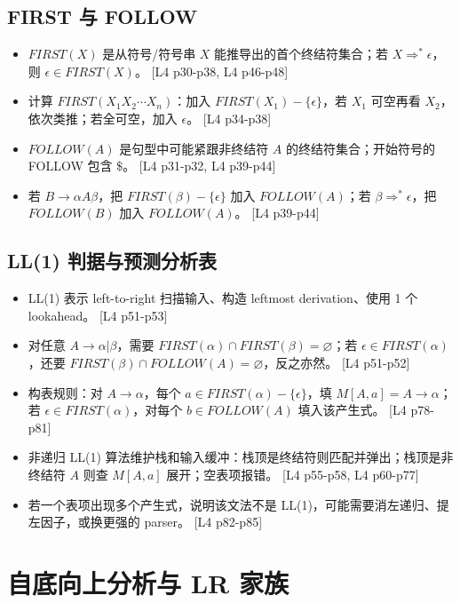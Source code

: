 \documentclass[UTF8,fontset=none,11pt]{ctexart}
\newcommand{\pg}[1]{{\scriptsize\textcolor{citegray}{[#1]}}}
\begin{document}
\subsection{FIRST 与 FOLLOW}

\begin{itemize}
  \item \(FIRST(X)\) 是从符号/符号串 \(X\) 能推导出的首个终结符集合；若 \(X\Rightarrow^*\epsilon\)，则 \(\epsilon\in FIRST(X)\)。 \pg{L4 p30-p38, L4 p46-p48}
  \item 计算 \(FIRST(X_1X_2\cdots X_n)\)：加入 \(FIRST(X_1)-\{\epsilon\}\)，若 \(X_1\) 可空再看 \(X_2\)，依次类推；若全可空，加入 \(\epsilon\)。 \pg{L4 p34-p38}
  \item \(FOLLOW(A)\) 是句型中可能紧跟非终结符 \(A\) 的终结符集合；开始符号的 FOLLOW 包含 \(\$\)。 \pg{L4 p31-p32, L4 p39-p44}
  \item 若 \(B\to\alpha A\beta\)，把 \(FIRST(\beta)-\{\epsilon\}\) 加入 \(FOLLOW(A)\)；若 \(\beta\Rightarrow^*\epsilon\)，把 \(FOLLOW(B)\) 加入 \(FOLLOW(A)\)。 \pg{L4 p39-p44}
\end{itemize}

\subsection{LL(1) 判据与预测分析表}

\begin{itemize}
  \item LL(1) 表示 left-to-right 扫描输入、构造 leftmost derivation、使用 1 个 lookahead。 \pg{L4 p51-p53}
  \item 对任意 \(A\to\alpha|\beta\)，需要 \(FIRST(\alpha)\cap FIRST(\beta)=\varnothing\)；若 \(\epsilon\in FIRST(\alpha)\)，还要 \(FIRST(\beta)\cap FOLLOW(A)=\varnothing\)，反之亦然。 \pg{L4 p51-p52}
  \item 构表规则：对 \(A\to\alpha\)，每个 \(a\in FIRST(\alpha)-\{\epsilon\}\)，填 \(M[A,a]=A\to\alpha\)；若 \(\epsilon\in FIRST(\alpha)\)，对每个 \(b\in FOLLOW(A)\) 填入该产生式。 \pg{L4 p78-p81}
  \item 非递归 LL(1) 算法维护栈和输入缓冲：栈顶是终结符则匹配并弹出；栈顶是非终结符 \(A\) 则查 \(M[A,a]\) 展开；空表项报错。 \pg{L4 p55-p58, L4 p60-p77}
  \item 若一个表项出现多个产生式，说明该文法不是 LL(1)，可能需要消左递归、提左因子，或换更强的 parser。 \pg{L4 p82-p85}
\end{itemize}

\section{自底向上分析与 LR 家族}
\end{document}
